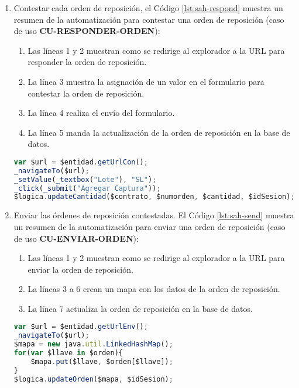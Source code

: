 \begin{enumerate}
	\item Contestar cada orden de reposición, el Código \ref{lst:sah-respond} muestra un resumen de la automatización para contestar una orden de reposición (caso de uso \textbf{CU-RESPONDER-ORDEN}):
	\begin{enumerate}
		\item Las líneas 1 y 2 muestran como se redirige al explorador a la URL para responder la orden de reposición.
		\item  La línea 3 muestra la asignación de un valor en el formulario para contestar la orden de reposición.
		\item La línea 4 realiza el envío del formulario.
		\item La línea 5 manda la actualización de la orden de reposición en la base de datos.
	\end{enumerate}
	\begin{lstlisting}[language=Javascript, caption={Responder orden de reposición.}, captionpos=b, label={lst:sah-respond}]
var $url = $entidad.getUrlCon();
_navigateTo($url);
_setValue(_textbox("Lote"), "SL");
_click(_submit("Agregar Captura"));
$logica.updateCantidad($contrato, $numorden, $cantidad, $idSesion);
	\end{lstlisting}

	\item Enviar las órdenes de reposición contestadas. El Código \ref{lst:sah-send} muestra un resumen de la automatización para enviar una orden de reposición (caso de uso \textbf{CU-ENVIAR-ORDEN}):
	\begin{enumerate}
		\item Las líneas 1 y 2 muestran como se redirige al explorador a la URL para enviar la orden de reposición.
		\item La líneas 3 a 6 crean un mapa con los datos de la orden de reposición.
		\item La línea 7 actualiza la orden de reposición en la base de datos. 
	\end{enumerate}
	\begin{lstlisting}[language=Javascript, caption={Enviar orden de reposición.}, captionpos=b, label={lst:sah-send}]
var $url = $entidad.getUrlEnv();
_navigateTo($url);
$mapa = new java.util.LinkedHashMap();
for(var $llave in $orden){
	$mapa.put($llave, $orden[$llave]);
}
$logica.updateOrden($mapa, $idSesion);
	\end{lstlisting}
\end{enumerate}

